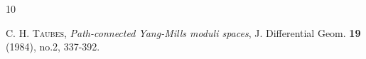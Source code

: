 \documentclass[12pt, a4paper]{article}
\renewcommand{\(}{\left(}
\renewcommand{\)}{\right)}
\begin{document}
\begin{thebibliography}{10}


 \textsc{C. H. Taubes}, \emph{Path-connected Yang-Mills moduli spaces}, J. Differential Geom. \textbf{19} (1984), no.2, 337-392.


\end{thebibliography}
\end{document}
